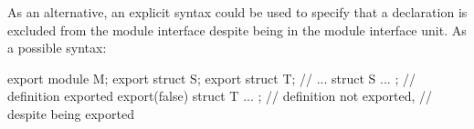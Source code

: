 As an alternative, an explicit syntax could be used
to specify that a declaration is excluded from the module interface
despite being in the module interface unit.
As a possible syntax:

\begin{codeblock}
export module M;
export struct S;
export struct T;
// ...
struct S { ... };                    // definition exported
export(false) struct T { ... };      // definition not exported,
                                     // despite  being exported
\end{codeblock}

